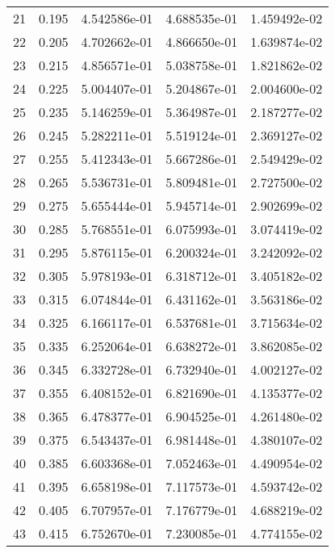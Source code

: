 \begin{table}[ht]
\begin{tabular}{rcccc}
    21 &  0.195 &    4.542586e-01 &    4.688535e-01  &     1.459492e-02\\ 
    22 &  0.205 &    4.702662e-01 &    4.866650e-01  &     1.639874e-02\\ 
    23 &  0.215 &    4.856571e-01 &    5.038758e-01  &     1.821862e-02\\ 
    24 &  0.225 &    5.004407e-01 &    5.204867e-01  &     2.004600e-02\\ 
    25 &  0.235 &    5.146259e-01 &    5.364987e-01  &     2.187277e-02\\ 
    26 &  0.245 &    5.282211e-01 &    5.519124e-01  &     2.369127e-02\\ 
    27 &  0.255 &    5.412343e-01 &    5.667286e-01  &     2.549429e-02\\ 
    28 &  0.265 &    5.536731e-01 &    5.809481e-01  &     2.727500e-02\\ 
    29 &  0.275 &    5.655444e-01 &    5.945714e-01  &     2.902699e-02\\ 
    30 &  0.285 &    5.768551e-01 &    6.075993e-01  &     3.074419e-02\\ 
    31 &  0.295 &    5.876115e-01 &    6.200324e-01  &     3.242092e-02\\ 
    32 &  0.305 &    5.978193e-01 &    6.318712e-01  &     3.405182e-02\\ 
    33 &  0.315 &    6.074844e-01 &    6.431162e-01  &     3.563186e-02\\ 
    34 &  0.325 &    6.166117e-01 &    6.537681e-01  &     3.715634e-02\\ 
    35 &  0.335 &    6.252064e-01 &    6.638272e-01  &     3.862085e-02\\ 
    36 &  0.345 &    6.332728e-01 &    6.732940e-01  &     4.002127e-02\\ 
    37 &  0.355 &    6.408152e-01 &    6.821690e-01  &     4.135377e-02\\ 
    38 &  0.365 &    6.478377e-01 &    6.904525e-01  &     4.261480e-02\\ 
    39 &  0.375 &    6.543437e-01 &    6.981448e-01  &     4.380107e-02\\ 
    40 &  0.385 &    6.603368e-01 &    7.052463e-01  &     4.490954e-02\\ 
    41 &  0.395 &    6.658198e-01 &    7.117573e-01  &     4.593742e-02\\ 
    42 &  0.405 &    6.707957e-01 &    7.176779e-01  &     4.688219e-02\\ 
    43 &  0.415 &    6.752670e-01 &    7.230085e-01  &     4.774155e-02\\ 

\end{tabular}
\end{table}
